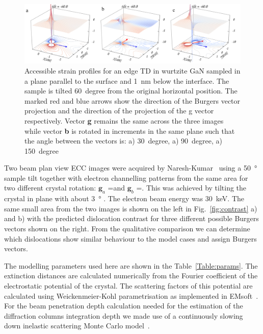 \begin{figure}[ht]
    \centering
    \includegraphics[width=1.1\linewidth]{Figures/rotateEdge.png}
    \caption[Edge TD ECC-strain in different orientations.]{Accessible strain profiles for an edge TD in wurtzite GaN sampled in a plane parallel  to the surface and \SI{1}{\nano \meter} below the interface. The sample is tilted  \SI{60}{degree} from the original horizontal position. The marked red and blue arrows show the direction of the Burgers vector projection and the direction of the projection of the g vector respectively. Vector\textbf{ g} remains the same across the three images while vector \textbf{b} is rotated in  increments in the same plane such that the angle between the vectors is: a) \SI{30}{degree}, a) \SI{90}{degree}, a) \SI{150}{degree} }
    \label{fig:rotateEdge}
\end{figure}



Two beam plan view ECC images were acquired by Naresh-Kumar~\cite{Naresh} using a \SI{50}{\degree}       sample tilt together with electron channelling patterns from the same area for two different crystal rotation: $\mathbf{g}_a$ =\hkl[-5-7-3] and $\mathbf{g}_b$ =\hkl[75-3]. This was achieved by tilting the crystal in plane with about \SI{3}{\degree} . The electron beam energy was \SI{30}{\kilo \electronvolt}. The same small area from the two images is shown on the left in Fig.~\ref{fig:contrast} a) and b) with the predicted dislocation contrast for three different possible Burgers vectors shown on the right. From the qualitative comparison we can determine which dislocations show similar behaviour to the model cases and assign Burgers vectors.

The modelling parameters used here are shown in the Table~\ref{Table:params}. The extinction distances are calculated numerically from the Fourier coefficient of the electrostatic potential of the crystal. The scattering factors of this potential are calculated using Weickenmeier-Kohl parametrisation as implemented in EMsoft~\cite{EMsoft}. For the beam penetration depth calculation needed for the estimation of the diffraction columns integration depth we made use of a continuously slowing down inelastic scattering Monte Carlo model~\cite{casino}. 






